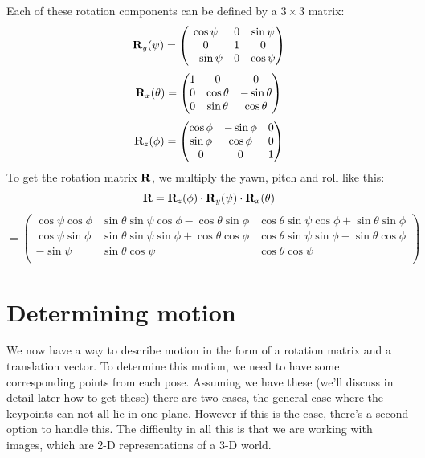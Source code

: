 Each of these rotation components can be defined by a $3\times3$ matrix:
\begin{equation}
    \mathbf{R}_y(\psi) = \begin{pmatrix}
        \cos\psi & 0 & \sin\psi \\
        0 & 1 & 0 \\
        -\sin\psi & 0 & \cos\psi
    \end{pmatrix}
\end{equation}
\begin{equation}
    \mathbf{R}_x(\theta) = \begin{pmatrix}
        1 & 0 & 0 \\
        0 & \cos\theta & -\sin\theta \\
        0 & \sin\theta & \cos\theta \\
    \end{pmatrix}
\end{equation}
\begin{equation}
    \mathbf{R}_z(\phi) = \begin{pmatrix}
        \cos\phi & -\sin\phi & 0 \\
        \sin\phi & \cos\phi & 0 \\
        0 & 0 & 1
    \end{pmatrix}
\end{equation}
To get the rotation matrix $\mathbf{R}$, we multiply the yawn, pitch and roll like this:
\begin{equation}
    \mathbf{R} = \mathbf{R}_z(\phi)\cdot\mathbf{R}_y(\psi)\cdot\mathbf{R}_x(\theta)
\end{equation}
\begin{equation*}
    = \begin{pmatrix}
    \cos\psi\cos\phi & \sin\theta\sin\psi\cos\phi - \cos\theta\sin\phi & \cos\theta\sin\psi\cos\phi + \sin\theta\sin\phi \\
    \cos\psi\sin\phi & \sin\theta\sin\psi\sin\phi + \cos\theta\cos\phi & \cos\theta\sin\psi\sin\phi - \sin\theta\cos\phi \\
    -\sin\psi          & \sin\theta\cos\psi                                  & \cos\theta\cos\psi \\
  \end{pmatrix} 
\end{equation*}

\section{Determining motion}
We now have a way to describe motion in the form of a rotation matrix and a translation vector. To determine this motion, we need to have some corresponding points from each pose. Assuming we have these (we'll discuss in detail later how to get these) there are two cases, the general case where the keypoints can not all lie in one plane. However if this is the case, there's a second option to handle this. The difficulty in all this is that we are working with images, which are 2-D representations of a 3-D world. 

